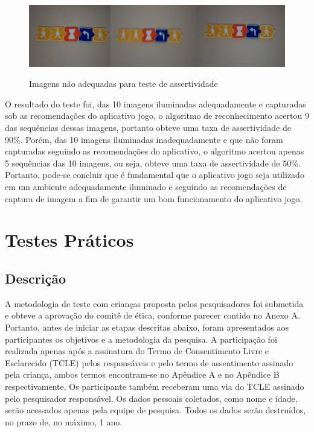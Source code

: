 \begin{figure}[H]
    \caption{Imagens não adequadas para teste de assertividade}
    \centering
    \includegraphics[width=15cm]{Imagens/Cap5/tta_ruim.PNG}
    \label{figura:tta_ruim}
\end{figure}

O resultado do teste foi, das 10 imagens iluminadas adequadamente e capturadas sob as recomendações do aplicativo jogo, o algoritmo de reconhecimento acertou 9 das sequências dessas imagens, portanto obteve uma taxa de assertividade de 90\%. Porém, das 10 imagens iluminadas inadequadamente e que não foram capturadas seguindo as recomendações do aplicativo, o algoritmo acertou apenas 5 sequências das 10 imagens, ou seja, obteve uma taxa de assertividade de 50\%. Portanto, pode-se concluir que é fundamental que o aplicativo jogo seja utilizado em um ambiente adequadamente iluminado e seguindo as recomendações de captura de imagem a fim de garantir um bom funcionamento do aplicativo jogo.


\section{Testes Práticos}

\subsection{\textbf{Descrição}}


A metodologia de teste com crianças proposta pelos pesquisadores foi submetida e obteve a aprovação do comitê de ética, conforme parecer contido no Anexo A. Portanto, antes de iniciar as etapas descritas abaixo, foram apresentados aos participantes os objetivos e a metodologia da pesquisa. A participação foi  realizada apenas após a assinatura do Termo de Consentimento Livre e Esclarecido (TCLE) pelos responsáveis e pelo termo de assentimento assinado pela criança, ambos termos encontram-se no Apêndice A e no Apêndice B respectivamente. Os participante também receberam uma via do TCLE assinado pelo pesquisador responsável. Os dados pessoais coletados, como nome e idade, serão acessados apenas pela equipe de pesquisa. Todos os dados serão destruídos, no prazo de, no máximo, 1 ano.

